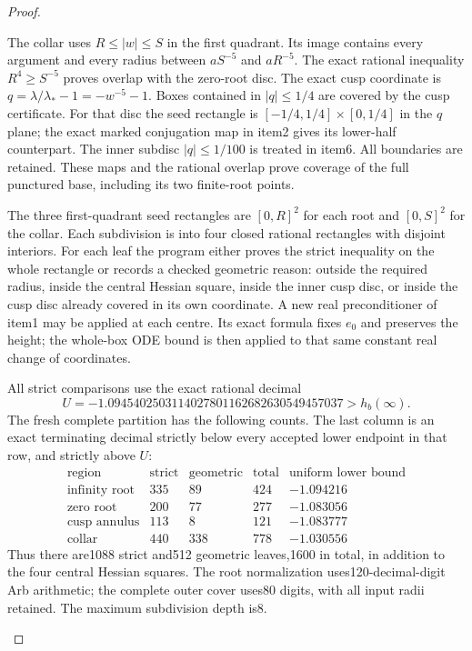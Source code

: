\begin{proof}
\begin{enumerate}[label=\arabic*.]
The collar uses $R\le|w|\le S$ in the first quadrant.
Its image contains every argument and every radius between
$aS^{-5}$ and $aR^{-5}$.  The exact rational inequality
$R^4\ge S^{-5}$ proves overlap with the zero-root disc.
The exact cusp coordinate is
$q=\lambda/\lambda_*-1=-w^{-5}-1$.
Boxes contained in $|q|\le1/4$ are covered by the cusp certificate.
For that disc the seed rectangle is
$[-1/4,1/4]\times[0,1/4]$ in the $q$ plane; the exact marked
conjugation map in item2 gives its lower-half counterpart.
The inner subdisc $|q|\le1/100$ is treated in item6.
All boundaries are retained.  These maps and the rational overlap
prove coverage of the full punctured base, including its two
finite-root points.

The three first-quadrant seed rectangles are $[0,R]^2$ for
each root and $[0,S]^2$ for the collar.  Each subdivision is into
four closed rational rectangles with disjoint interiors.
For each leaf the program either proves the strict inequality
on the whole rectangle or records a checked geometric reason:
outside the required radius, inside the central Hessian square,
inside the inner cusp disc, or inside the cusp disc already
covered in its own coordinate.  A new real preconditioner of
item1 may be applied at each centre.  Its exact formula fixes
$e_0$ and preserves the height; the whole-box ODE bound is then
applied to that same constant real change of coordinates.

All strict comparisons use the exact rational decimal
\[
 U=-1.0945402503114027801162682630549457037>h_b(\infty).
\]
The fresh complete partition has the following counts. The last
column is an exact terminating decimal strictly below every
accepted lower endpoint in that row, and strictly above $U$:
\[
\begin{array}{lrrrr}
 \text{region}&\text{strict}&\text{geometric}&\text{total}
     &\text{uniform lower bound}\\\hline
 \text{infinity root}&335&89&424&-1.094216\\
 \text{zero root}&200&77&277&-1.083056\\
 \text{cusp annulus}&113&8&121&-1.083777\\
 \text{collar}&440&338&778&-1.030556
\end{array}
\]
Thus there are1088 strict and512 geometric leaves,1600 in total,
in addition to the four central Hessian squares.
The root normalization uses120-decimal-digit Arb arithmetic;
the complete outer cover uses80 digits, with all input radii
retained.  The maximum subdivision depth is8.


\end{enumerate}
\end{proof}
